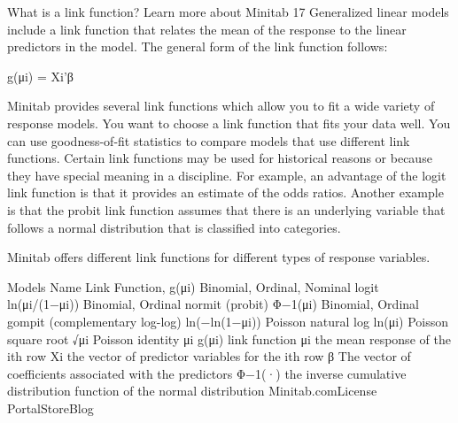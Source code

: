 What is a link function?
Learn more about Minitab 17 
Generalized linear models include a link function that relates the mean of the response to the linear predictors in the model. The general form of the link function follows:

g(μi) = Xi'β

Minitab provides several link functions which allow you to fit a wide variety of response models. You want to choose a link function that fits your data well. You can use goodness-of-fit statistics to compare models that use different link functions. Certain link functions may be used for historical reasons or because they have special meaning in a discipline. For example, an advantage of the logit link function is that it provides an estimate of the odds ratios. Another example is that the probit link function assumes that there is an underlying variable that follows a normal distribution that is classified into categories.

Minitab offers different link functions for different types of response variables.

Models	Name	Link Function, g(μi)
Binomial, Ordinal, Nominal	logit	ln(μi/(1−μi))
Binomial, Ordinal	normit (probit)	Φ−1(μi)
Binomial, Ordinal	gompit (complementary log-log)	ln(−ln(1−μi))
Poisson	natural log	ln(μi)
Poisson	square root	√μi
Poisson	identity	μi
g(μi)
link function
μi
the mean response of the ith row
Xi
the vector of predictor variables for the ith row
β
The vector of coefficients associated with the predictors
Φ−1(·)
the inverse cumulative distribution function of the normal distribution
Minitab.comLicense PortalStoreBlog
